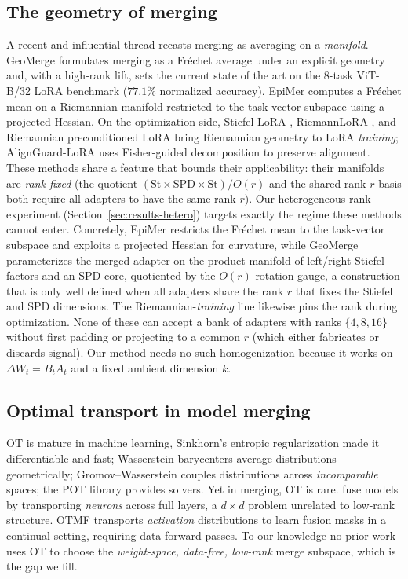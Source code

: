 \documentclass[11pt]{article}
\newcommand{\dW}{\Delta W}
\begin{document}
\subsection{The geometry of merging}
A recent and influential thread recasts merging as averaging on a \emph{manifold}. GeoMerge
\citep{dasilva2026geomerge} formulates merging as a Fr\'echet average under an explicit geometry and,
with a high-rank lift, sets the current state of the art on the $8$-task ViT-B/32 LoRA benchmark
($77.1\%$ normalized accuracy). EpiMer \citep{lu2026epimer} computes a Fr\'echet mean on a Riemannian
manifold restricted to the task-vector subspace using a projected Hessian. On the optimization side,
Stiefel-LoRA \citep{park2025stiefel}, RiemannLoRA \citep{bogachev2025riemannlora}, and Riemannian
preconditioned LoRA \citep{zhang2024riemannian} bring Riemannian geometry to LoRA \emph{training};
AlignGuard-LoRA \citep{das2025alignguard} uses Fisher-guided decomposition to preserve alignment.
These methods share a feature that bounds their applicability: their manifolds are \emph{rank-fixed}
(the quotient $(\mathrm{St}\times\mathrm{SPD}\times\mathrm{St})/O(r)$ and the shared rank-$r$ basis both
require all adapters to have the same rank $r$). Our heterogeneous-rank experiment
(Section~\ref{sec:results-hetero}) targets exactly the regime these methods cannot enter.
Concretely, EpiMer \citep{lu2026epimer} restricts the Fr\'echet mean to the task-vector subspace and
exploits a projected Hessian for curvature, while GeoMerge \citep{dasilva2026geomerge} parameterizes the
merged adapter on the product manifold of left/right Stiefel factors and an SPD core, quotiented by the
$O(r)$ rotation gauge, a construction that is only well defined when all adapters share the rank $r$
that fixes the Stiefel and SPD dimensions. The Riemannian-\emph{training} line
\citep{zhang2024riemannian,park2025stiefel,bogachev2025riemannlora} likewise pins the rank during
optimization. None of these can accept a bank of adapters with ranks $\{4,8,16\}$ without first padding or
projecting to a common $r$ (which either fabricates or discards signal). Our method needs no such
homogenization because it works on $\dW_t=B_tA_t$ and a fixed ambient dimension $k$.

\subsection{Optimal transport in model merging}
OT is mature in machine learning, Sinkhorn's entropic regularization \citep{cuturi2013sinkhorn} made
it differentiable and fast; Wasserstein barycenters \citep{agueh2011barycenters} average distributions
geometrically; Gromov--Wasserstein \citep{memoli2011gromov,peyre2016gromov} couples distributions across
\emph{incomparable} spaces; the POT library \citep{flamary2021pot} provides solvers. Yet in merging, OT
is rare. \citet{singh2020fusion} fuse models by transporting \emph{neurons} across full layers, a
$d\times d$ problem unrelated to low-rank structure. OTMF \citep{pan2025otmf} transports
\emph{activation} distributions to learn fusion masks in a continual setting, requiring data forward
passes. To our knowledge no prior work uses OT to choose the \emph{weight-space, data-free, low-rank}
merge subspace, which is the gap we fill.
\end{document}

